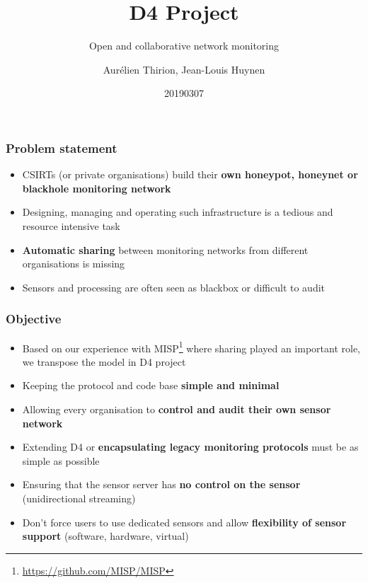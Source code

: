 \documentclass{beamer}
\title{D4 Project}
\subtitle{Open and collaborative network monitoring}
\author{Aurélien Thirion, Jean-Louis Huynen}
\institute{Team CIRCL \\ \url{https://www.d4-project.org/}}
\date{20190307}
\begin{document}
    \begin{frame}
        \maketitle
    \end{frame}

\begin{frame}
        \frametitle{Problem statement}
        \begin{itemize}
                \item CSIRTs (or private organisations) build their {\bf own honeypot, honeynet or blackhole monitoring network}
                \item Designing, managing and operating such infrastructure is a tedious and resource intensive task
                \item {\bf Automatic sharing} between monitoring networks from different organisations is missing
                \item Sensors and processing are often seen as blackbox or difficult to audit

        \end{itemize}
\end{frame}


\begin{frame}
 \frametitle{Objective}
 \begin{itemize}
         \item Based on our experience with MISP\footnote{\url{https://github.com/MISP/MISP}} where sharing played an important role, we transpose
                 the model in D4 project
         \item Keeping the protocol and code base {\bf simple and minimal}
         \item Allowing every organisation to {\bf control and audit their own sensor network}
         \item Extending D4 or {\bf encapsulating legacy monitoring protocols} must be as simple as possible
         \item Ensuring that the sensor server has {\bf no control on the sensor} (unidirectional streaming)
         \item Don't force users to use dedicated sensors and allow {\bf flexibility of sensor support} (software, hardware, virtual)

 \end{itemize}
\end{frame}
\end{document}
